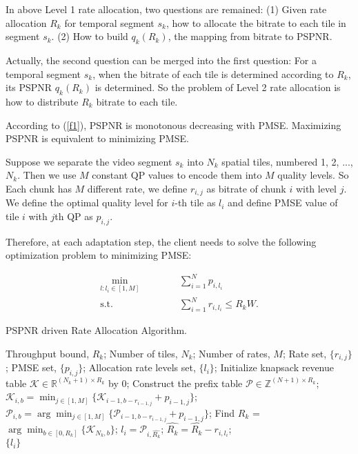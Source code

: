 In above Level 1 rate allocation, two questions are remained: (1) Given rate allocation $R_k$ for temporal segment $s_k$, how to allocate the bitrate to each tile in segment $s_k$. (2) How to build $q_k(R_k)$, the mapping from bitrate to PSPNR. 

Actually, the second question can be merged into the first question: For a temporal segment $s_k$, when the bitrate of each tile is determined according to $R_k$, its PSPNR $q_k(R_k)$ is determined. So the problem of Level 2 rate allocation is how to distribute $R_k$ bitrate to each tile.

According to (\ref{f1}), PSPNR is monotonous decreasing with PMSE. Maximizing PSPNR is equivalent to minimizing PMSE.

Suppose we separate the video segment $s_k$ into $N_k$ spatial tiles, numbered 1, 2, ..., $N_k$. Then we use $M$ constant QP values to encode them into $M$ quality levels. So Each chunk has $M$ different rate, we define $r_{i, j}$ as bitrate of chunk $i$ with level $j$. We define the optimal quality level for $i$-th tile as $l_i$ and define PMSE value of tile $i$ with $j$th QP as $p_{i, j}$.

Therefore, at each adaptation step, the client needs to solve the following optimization problem to minimizing PMSE:

\begin{equation}
\begin{aligned}
\min_{l: l_i \in [1, M]} \text{~~~~~~} & \text{~~~~} \sum_{i = 1}^N p_{i, l_i} \\
\text{s.t.} \text{~~~~} & \text{~~~~}\sum_{i=1}^N r_{i,l_i} \le R_kW.
\end{aligned}
\end{equation}

\begin{algorithm}[t]
\caption{ PSPNR driven Rate Allocation Algorithm.}
\label{alg:Framwork}
\begin{algorithmic}[1]
\Require
Throughput bound, $R_k$;
Number of tiles, $N_k$;
Number of rates, $M$;
Rate set, $\{r_{i,j}\}$;
PMSE set, $\{p_{i,j}\}$;
\Ensure
Allocation rate levels set, $\{l_i\}$;
\State Initialize knapsack revenue table $\mathcal{K}\in \mathbb{R}^{(N_k+1)\times R_k}$ by 0;
\State Construct the prefix table $\mathcal{P}\in \mathbb{Z}^{(N+1)\times R_k}$;
    \State $\mathcal{K}_{i,b} = \min_{j\in[1,M]}\{\mathcal{K}_{i-1,b-r_{i-1,j}} + p_{i-1,j}\}$;
    \State $\mathcal{P}_{i,b} = \arg\min_{j\in[1,M]}\{\mathcal{P}_{i-1,b-r_{i-1,j}} + p_{i-1,j}\}$;
  \EndFor
\EndFor
\State Find $\hat{R_k}$ = $\arg\min_{b\in [0,R_k]} \{\mathcal{K}_{N_k,b}\}$;
  \State $l_i = \mathcal{P}_{i,\hat{R_k}}$;
  \State $\hat{R_k} = \hat{R_k} - r_{i,l_i}$;
\EndFor \\
\Return $\{l_i\}$
\end{algorithmic}
\end{algorithm}


